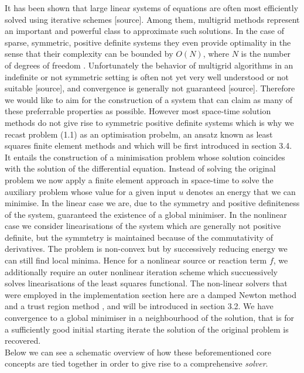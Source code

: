 \documentclass[../draft_1.tex]{subfiles}
\begin{document}
It has been shown that large linear systems of equations are often most efficiently solved using iterative schemes [source]. Among them, multigrid methods represent an important and powerful class to approximate such solutions. In the case of sparse, symmetric, positive definite systems they even provide optimality in the sense that their complexity can be bounded by $O(N)$, where $N$ is the number of degrees of freedom \cite{brandt1977multi}. Unfortunately the behavior of multigrid algorithms in an indefinite or not symmetric setting is often not yet very well understood or not suitable [source], and convergence is generally not guaranteed [source]. Therefore we would like to aim for the construction of a system that can claim as many of these preferrable properties as possible. However most space-time solution methods do not give rise to symmetric positive definite systems \cite{gander201550} which is why we recast problem (1.1) as an optimisation probelm, an ansatz known as least squares finite element methods \cite{bochev2009least} and which will be first introduced in section 3.4. It entails the construction of a minimisation problem whose solution coincides with the solution of the differential equation. Instead of solving the original problem we now apply a finite element approach in space-time to solve the auxiliary problem whose value for a given input $u$ denotes an energy that we can minimise. In the linear case we are, due to the symmetry and positive definiteness of the system, guaranteed the existence of a global minimiser. In the nonlinear case we consider linearisations of the system which are generally not positive definite, but the symmtetry is maintained because of the commutativity of derivatives. The problem is non-convex but by successively reducing energy we can still find local minima. Hence for a nonlinear source or reaction term $f$, we additionally require an outer nonlinear iteration scheme which succuessively solves linearisations of the least squares functional. The non-linear solvers that were employed in the implementation section here are a damped Newton method \cite{deuflhard2011newton} and a trust region method \cite{conn2000trust}, and will be introduced in section 3.2. We have convergence to a global minimiser in a neighbourhood of the solution, that is for a sufficiently good initial starting iterate the solution of the original problem is recovered.
\smallskip
\\
Below we can see a schematic overview of how these beforementioned core concepts are tied together in order to give rise to a comprehensive \textit{solver}.
\end{document}
